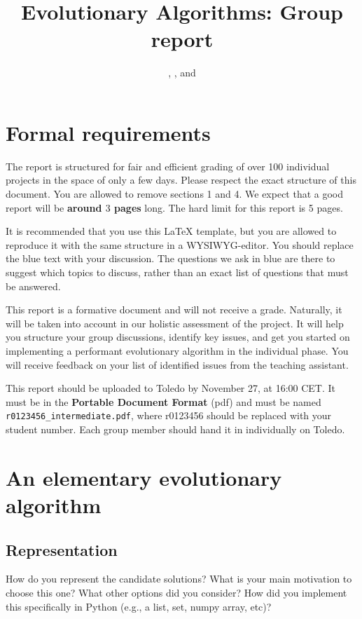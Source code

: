 \documentclass[a4paper,10pt]{article}
\title{Evolutionary Algorithms: Group report}
\author{\ReplaceMe{Group Member 1}, \ReplaceMe{Group Member 2}, and \ReplaceMe{Group Member 3}}
\newcommand{\thisyear}{\the\year}
\newcommand{\deadlineGroup}{November 27, \thisyear{} at 16:00 CET}
\newcommand{\ReplaceMe}[1]{{\color{blue}#1}}
\begin{document}
\selectfont{}

\maketitle

\section{Formal requirements}

The report is structured for fair and efficient grading of over 100 individual projects in the space of only a few days. Please respect the exact structure of this document. You are allowed to remove sections 1 and 4. We expect that a good report will be \textbf{around $3$ pages} long. The hard limit for this report is 5 pages. 

It is recommended that you use this \LaTeX{} template, but you are allowed to reproduce it with the same structure in a WYSIWYG-editor. You should replace the blue text with your discussion. The questions we ask in blue are there to suggest which topics to discuss, rather than an exact list of questions that must be answered.

This report is a formative document and will not receive a grade. Naturally, it will be taken into account in our holistic assessment of the project. It will help you structure your group discussions, identify key issues, and get you started on implementing a performant evolutionary algorithm in the individual phase.
You will receive feedback on your list of identified issues from the teaching assistant.

This report should be uploaded to Toledo by \deadlineGroup. It must be in the \textbf{Portable Document Format} (pdf) and must be named \texttt{r0123456\_intermediate.pdf}, where r0123456 should be replaced with your student number. Each group member should hand it in individually on Toledo.


\section{An elementary evolutionary algorithm} 

\subsection{Representation}

\ReplaceMe{How do you represent the candidate solutions? What is your main motivation to choose this one? What other options did you consider? How did you implement this specifically in Python (e.g., a list, set, numpy array, etc)?}
\end{document}

